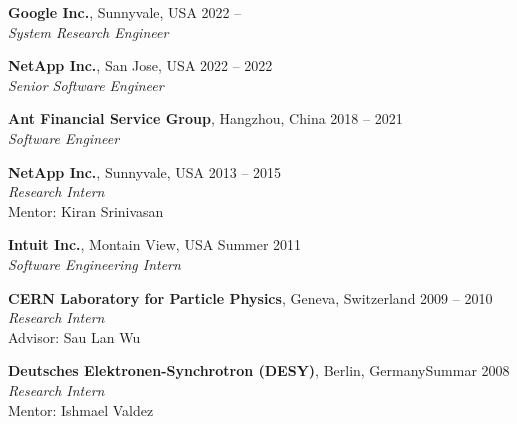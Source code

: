 \documentclass[10pt, letterpaper]{article}
\renewenvironment{itemize}{
  \begin{list}{}{
    \setlength{\leftmargin}{1.2em}
    \setlength{\itemsep}{0.12em}
    \setlength{\parskip}{0pt}
    \setlength{\parsep}{0.12em}
  }
}{
  \end{list}
}
\begin{document}
\begin{itemize}

\item {\bf Google Inc.}, Sunnyvale, USA \hfill 2022 -- \\
{\it System Research Engineer} %

\item {\bf NetApp Inc.}, San Jose, USA \hfill 2022 -- 2022 \\
{\it Senior Software Engineer} %

\item {\bf Ant Financial Service Group}, Hangzhou, China \hfill 2018 -- 2021\\
{\it Software Engineer} %

\item {\bf NetApp Inc.}, Sunnyvale, USA \hfill 2013 -- 2015\\
{\it Research Intern} \\ Mentor: Kiran Srinivasan

\item {\bf Intuit Inc.}, Montain View, USA \hfill Summer 2011\\
{\it Software Engineering Intern} %

\item {\bf CERN Laboratory for Particle Physics}, Geneva, Switzerland
  \hfill 2009 -- 2010\\
{\it Research Intern} \\Advisor: Sau Lan Wu

\item {\bf Deutsches Elektronen-Synchrotron (DESY)}, Berlin, Germany\hfill Summar 2008\\
{\it Research Intern} \\Mentor: Ishmael Valdez
\end{itemize}



\end{document}
